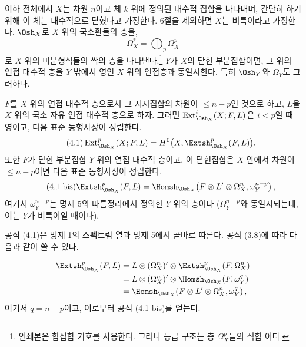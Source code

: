 
이하 전체에서 $X$는 차원 $n$이고 체 $k$ 위에 정의된 대수적 집합을
나타내며, 간단히 하기 위해 이 체는 대수적으로 닫혔다고 가정한다. 6절을
제외하면 $X$는 비특이라고 가정한다. $\Osh_X$로 $X$ 위의 국소환들의 층을,
\[
  \Omega_X^{*}=\bigoplus_p\Omega_X^{p}
\]
로 $X$ 위의 미분형식들의 싹의 층을 나타낸다.\footnote{인쇄본은
합집합 기호를 사용한다. 그러나 등급 구조는 층 $\Omega_X^p$들의 직합
이다.} $Y$가 $X$의 닫힌 부분집합이면, 그 위의 연접 대수적 층을
$Y$ 밖에서 영인 $X$ 위의 연접층과 동일시한다. 특히 $\Osh_Y$와
$\Omega_Y$도 그러하다.

 $F$를 $X$ 위의 연접 대수적 층으로서 그 지지집합의
차원이 $\leq n-p$인 것으로 하고, $L$을 $X$ 위의 국소 자유 연접 대수적 층으로
하자. 그러면 $\operatorname{Ext}_{\Osh_X}^{i}(X;F,L)$은 $i<p$일 때 영이고,
다음 표준 동형사상이 성립한다.
\begin{equation}\tag{4.1}
  \operatorname{Ext}_{\Osh_X}^{p}(X;F,L)
  =H^{0}\bigl(X,\Extsh_{\Osh_X}^{p}(F,L)\bigr).
\end{equation}
또한 $F$가 닫힌 부분집합 $Y$ 위의 연접 대수적 층이고, 이 닫힌집합은 $X$ 안에서
차원이 $\leq n-p$이면 다음 표준 동형사상이 성립한다.
\begin{equation}\tag{4.1 bis}
  \Extsh_{\Osh_X}^{p}(F,L)
  =\Homsh_{\Osh_X}\!\left(
    F\otimes L'\otimes\Omega_X^{n},\omega_Y^{n-p}
  \right),
\end{equation}
여기서 $\omega_Y^{n-p}$는 명제 5의 따름정리에서 정의한 $Y$ 위의 층이다
($\Omega_Y^{n-p}$와 동일시되는데, 이는 $Y$가 비특이일 때이다).

공식 (4.1)은 명제 1의 스펙트럼 열과 명제 5에서 곧바로 따른다. 공식
(3.8)에 따라 다음과 같이 쓸 수 있다.

\begin{align*}
\Extsh_{\Osh_X}^{p}(F,L)
&=L\otimes(\Omega_X^{n})'\otimes
  \Extsh_{\Osh_X}^{p}(F,\Omega_X^{n})\\
&=L\otimes(\Omega_X^{n})'\otimes
  \Homsh_{\Osh_X}(F,\omega_Y^{q})\\
&=\Homsh_{\Osh_X}\!\left(
  F\otimes L'\otimes\Omega_X^{n},\omega_Y^{q}\right),
\end{align*}
여기서 $q=n-p$이고, 이로부터 공식 (4.1 bis)를 얻는다.

